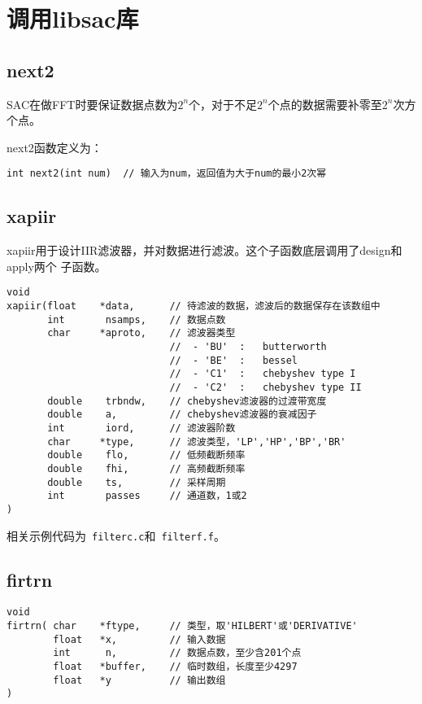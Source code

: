 \section{调用libsac库}
\label{sec:libsac}
\subsection{next2}
SAC在做FFT时要保证数据点数为$2^n$个，对于不足$2^n$个点的数据需要补零至$2^n$次方个点。

next2函数定义为：
\begin{verbatim}
int next2(int num)  // 输入为num，返回值为大于num的最小2次幂
\end{verbatim}

\subsection{xapiir}
xapiir用于设计IIR滤波器，并对数据进行滤波。这个子函数底层调用了design和apply两个
子函数。
\begin{verbatim}
void
xapiir(float    *data,      // 待滤波的数据，滤波后的数据保存在该数组中
       int       nsamps,    // 数据点数
       char     *aproto,    // 滤波器类型
                            //  - 'BU'  :   butterworth
                            //  - 'BE'  :   bessel
                            //  - 'C1'  :   chebyshev type I
                            //  - 'C2'  :   chebyshev type II
       double    trbndw,    // chebyshev滤波器的过渡带宽度
       double    a,         // chebyshev滤波器的衰减因子
       int       iord,      // 滤波器阶数
       char     *type,      // 滤波类型，'LP','HP','BP','BR'
       double    flo,       // 低频截断频率
       double    fhi,       // 高频截断频率
       double    ts,        // 采样周期
       int       passes     // 通道数，1或2
)
\end{verbatim}

相关示例代码为~\verb+filterc.c+和~\verb+filterf.f+。

\subsection{firtrn}
\begin{verbatim}
void
firtrn( char    *ftype,     // 类型，取'HILBERT'或'DERIVATIVE'
        float   *x,         // 输入数据
        int      n,         // 数据点数，至少含201个点
        float   *buffer,    // 临时数组，长度至少4297
        float   *y          // 输出数组
)
\end{verbatim}

